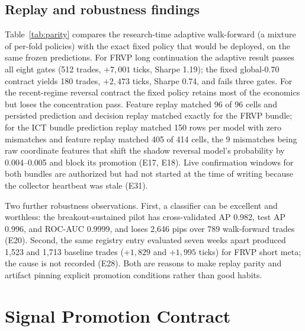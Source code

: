 \documentclass[10pt]{article}
\begin{document}
\subsection{Replay and robustness findings}

Table~\ref{tab:parity} compares the research-time adaptive walk-forward (a mixture of per-fold policies) with the exact fixed policy that would be deployed, on the same frozen predictions. For FRVP long continuation the adaptive result passes all eight gates (512 trades, $+7{,}001$ ticks, Sharpe 1.19); the fixed global-0.70 contract yields 180 trades, $+2{,}473$ ticks, Sharpe 0.74, and fails three gates. For the recent-regime reversal contract the fixed policy retains most of the economics but loses the concentration pass. Feature replay matched 96 of 96 cells and persisted prediction and decision replay matched exactly for the FRVP bundle; for the ICT bundle prediction replay matched 150 rows per model with zero mismatches and feature replay matched 405 of 414 cells, the 9 mismatches being raw coordinate features that shift the shadow reversal model's probability by 0.004--0.005 and block its promotion (E17, E18). Live confirmation windows for both bundles are authorized but had not started at the time of writing because the collector heartbeat was stale (E31).

\begin{table}[t]
\centering\small
\caption{Policy parity on frozen FRVP predictions (ES ticks). The adaptive walk-forward selects a policy variant per fold on the training split; the fixed live contract applies the packaged static policy to every fold. Source: paper-signal bundle run summary, 2026-08-16.}
\label{tab:parity}
\resizebox{\textwidth}{!}{}
\end{table}

Two further robustness observations. First, a classifier can be excellent and worthless: the breakout-sustained pilot has cross-validated AP 0.982, test AP 0.996, and ROC-AUC 0.9999, and loses 2,646 pips over 789 walk-forward trades (E20). Second, the same registry entry evaluated seven weeks apart produced 1,523 and 1,713 baseline trades ($+1{,}829$ and $+1{,}995$ ticks) for FRVP short meta; the cause is not recorded (E28). Both are reasons to make replay parity and artifact pinning explicit promotion conditions rather than good habits.

\section{Signal Promotion Contract}
\end{document}
